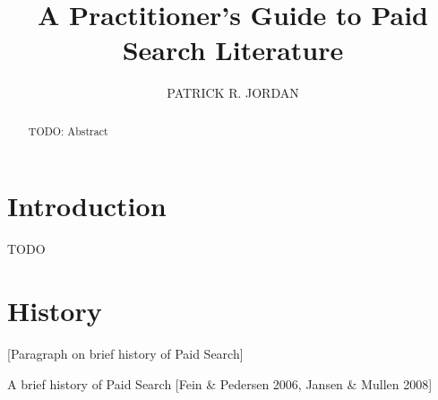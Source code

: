 \documentclass[prodmode,acmtist]{acmsmall} %
\begin{document}

\title{A Practitioner's Guide to Paid Search Literature}
\author{PATRICK R. JORDAN
}

\begin{abstract}
TODO: Abstract
\end{abstract}





\maketitle

\section{Introduction}

TODO

\section{History} %
\label{sec:history}

[Paragraph on brief history of Paid Search] 

A brief history of Paid Search [Fein \& Pedersen 2006, Jansen \& Mullen 2008] 
\end{document}
